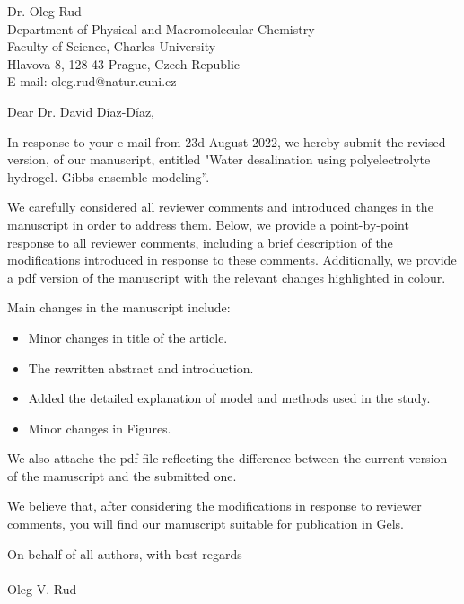\documentclass[12pt]{dinbrief}
\date{\today}
\newcommand{\theeditor}{Dr. David Díaz-Díaz}
\begin{document}
\begin{letter}{
Dr. Oleg Rud\\
Department of Physical and Macromolecular Chemistry\\
Faculty of Science, Charles University\\
Hlavova 8, 128 43 Prague, Czech Republic\\
E-mail: oleg.rud@natur.cuni.cz\\
}
\vspace*{-1.5cm}

\opening{Dear \theeditor,}


In response to your e-mail from 23d August 2022, we hereby submit the revised
version, of our manuscript, entitled "Water desalination using polyelectrolyte hydrogel. Gibbs ensemble modeling''.

We carefully considered all reviewer comments and introduced changes in the manuscript in order to address them.
Below, we provide a point-by-point response to all reviewer comments, including a brief description of the modifications introduced in response to these comments.
Additionally, we provide a pdf version of the manuscript with the relevant changes highlighted in colour.

Main changes in the manuscript include:
\begin{itemize}
    \item Minor changes in title of the article.
    \item The rewritten abstract and introduction.
    \item Added the detailed explanation of model and methods used in the study.
    \item Minor changes in Figures.

\end{itemize}

We also attache the pdf file reflecting the difference between the current version of the manuscript and the submitted one.

We believe that, after considering the modifications in response to reviewer comments, you will find our manuscript suitable for publication in Gels.

On behalf of all authors,
with best regards\\
\\
Oleg V. Rud\\


\end{letter}
\end{document}
